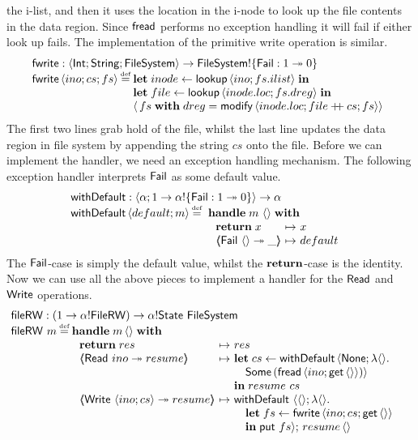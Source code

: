 \documentclass[12pt,phd,lfcs,twoside,openright,logo,leftchapter,normalheadings]{infthesis}
\theoremstyle{plain}
\theoremstyle{definition}
\begin{document}
the i-list, and then it uses the location in the i-node to look up the
file contents in the data region. Since $\mathsf{fread}$ performs no exception
handling it will fail if either look up fails. The implementation of
the primitive write operation is similar.
%
\[
  \bl
    \fwrite : \Record{\Int;\String;\FileSystem} \to \FileSystem \eff \{\Fail : \UnitType \opto \ZeroType\}\\
    \fwrite\,\Record{ino;cs;fs} \defas
      \ba[t]{@{}l}
        \Let\;inode \revto \lookup\,\Record{ino; fs.ilist}\;\In\\
        \Let\;file \revto \lookup\,\Record{inode.loc; fs.dreg}\;\In\\
        \Record{\,fs\;\keyw{with}\;dreg = \modify\,\Record{inode.loc;file \concat cs;fs}}
      \el
  \el
\]
%
The first two lines grab hold of the file, whilst the last line
updates the data region in file system by appending the string $cs$
onto the file.
%
Before we can implement the handler, we need an exception handling
mechanism. The following exception handler interprets $\mathsf{Fail}$ as some
default value.
%
\[
    \bl
      \faild : \Record{\alpha;\UnitType \to \alpha \eff \{\Fail : \UnitType \opto \ZeroType\}} \to \alpha\\
      \faild\,\Record{default;m} \defas
        \ba[t]{@{~}l}
          \Handle\;m~\Unit\;\With\\
           ~\ba{@{~}l@{~}c@{~}l}
              \Return\;x &\mapsto& x\\
              \OpCase{\Fail}{\Unit}{\_} &\mapsto& default
            \ea
        \ea
    \el
\]
%
The $\mathsf{Fail}$-case is simply the default value, whilst the
$\mathbf{return}$-case is the identity.
%
Now we can use all the above pieces to implement a handler for the
$\mathsf{Read}$ and $\mathsf{Write}$ operations.
%
\[
  \bl
    \fileRW : (\UnitType \to \alpha \eff \dec{FileRW}) \to \alpha \eff \State~\FileSystem\\
    \fileRW~m \defas
        \ba[t]{@{}l}
           \Handle\;m\,\Unit\;\With\\
             ~\ba{@{~}l@{~}c@{~}l}
                 \Return\;res      &\mapsto& res\\
                 \OpCase{\URead}{ino}{resume} &\mapsto&
                   \bl
                   \Let\;cs\revto \faild\,\Record{\None;\lambda\Unit.\\
                     \quad\Some\,(\fread\,\Record{ino;\Uget\,\Unit})}\\
                     \In\;resume~cs
                   \el\\
                 \OpCase{\UWrite}{\Record{ino;cs}}{resume} &\mapsto&
                     \ba[t]{@{}l}
                        \faild~\Record{\Unit; \lambda \Unit.\\
                          \quad\bl
                            \Let\;fs \revto \fwrite\,\Record{ino;cs;\Uget\,\Unit}\\
                            \In\;\Uput~fs};\,resume\,\Unit
                          \el
                     \ea
               \ea
         \ea
  \el
\]
\end{document}
